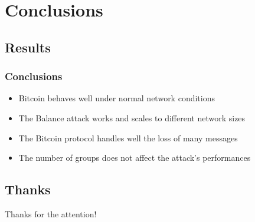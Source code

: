 \documentclass[pdf]{beamer}
\begin{document}
\section{Conclusions}
\subsection*{Results}
\begin{frame}
	\frametitle{Conclusions}
	\begin{itemize}
		\setlength \itemsep{0.8em}
		\item<1-> Bitcoin behaves well under normal network conditions
		\item<2-> The Balance attack works and scales to different network sizes
		\item<3-> The Bitcoin protocol handles well the loss of many messages
		\item<4-> The number of groups does not affect the attack's performances 
	\end{itemize}
\end{frame}

\subsection*{Thanks}
\begin{frame}[c]{}
	\centering
	\vspace*{1.3cm}
	\Large Thanks for the attention!
\end{frame}
\end{document}
